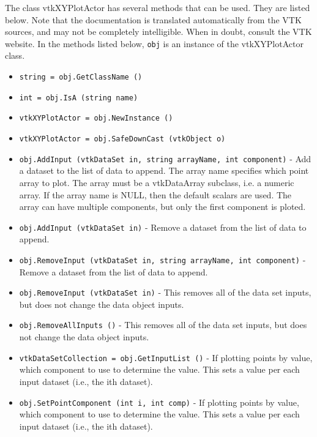 The class vtkXYPlotActor has several methods that can be used.
  They are listed below.
Note that the documentation is translated automatically from the VTK sources,
and may not be completely intelligible.  When in doubt, consult the VTK website.
In the methods listed below, \verb|obj| is an instance of the vtkXYPlotActor class.
\begin{itemize}
\item  \verb|string = obj.GetClassName ()|

\item  \verb|int = obj.IsA (string name)|

\item  \verb|vtkXYPlotActor = obj.NewInstance ()|

\item  \verb|vtkXYPlotActor = obj.SafeDownCast (vtkObject o)|

\item  \verb|obj.AddInput (vtkDataSet in, string arrayName, int component)| -  Add a dataset to the list of data to append. The array name specifies
 which point array to plot. The array must be a vtkDataArray subclass, i.e. 
 a numeric array. If the array name is NULL, then the default
 scalars are used.  The array can have multiple components, but only the
 first component is ploted.

\item  \verb|obj.AddInput (vtkDataSet in)| -  Remove a dataset from the list of data to append.

\item  \verb|obj.RemoveInput (vtkDataSet in, string arrayName, int component)| -  Remove a dataset from the list of data to append.

\item  \verb|obj.RemoveInput (vtkDataSet in)| -  This removes all of the data set inputs, 
 but does not change the data object inputs.

\item  \verb|obj.RemoveAllInputs ()| -  This removes all of the data set inputs, 
 but does not change the data object inputs.

\item  \verb|vtkDataSetCollection = obj.GetInputList ()| -  If plotting points by value, which component to use to determine the
 value. This sets a value per each input dataset (i.e., the ith dataset).

\item  \verb|obj.SetPointComponent (int i, int comp)| -  If plotting points by value, which component to use to determine the
 value. This sets a value per each input dataset (i.e., the ith dataset).


\end{itemize}
